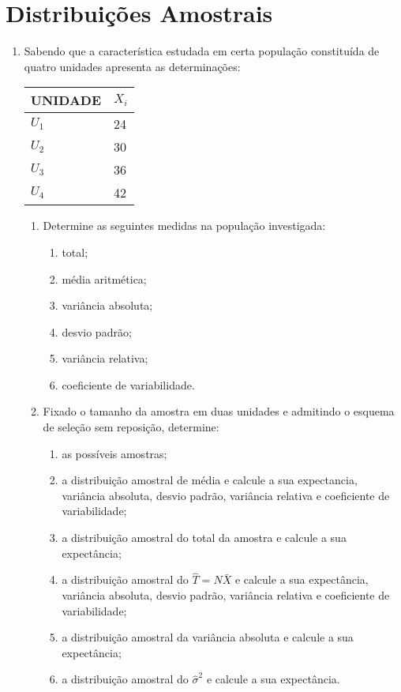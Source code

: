 \chapter{Distribuições Amostrais}

\begin{enumerate}[resume]

\item Sabendo que a característica estudada em certa população constituída de quatro unidades apresenta as determinações:
	\begin{table}[!htb]
	\centering
	\vspace{0.5cm}
	\begin{tabular}{ll}
	UNIDADE & $X_{i}$ \\
	\hline 
	$U_{1}$ & 24 \\
	$U_{2}$ & 30 \\
	$U_{3}$ & 36 \\
	$U_{4}$ & 42 \\
	\end{tabular}
	\end{table}
	\begin{enumerate}
	
	\item Determine as seguintes medidas na população investigada:
		\begin{enumerate}
		\item total;
		\item média aritmética; 
		\item variância absoluta;
		\item desvio padrão;
		\item variância relativa;
		\item coeficiente de variabilidade.
		\end{enumerate}
	
	\item Fixado o tamanho da amostra em duas unidades e admitindo o esquema de seleção sem reposição, determine:
		\begin{enumerate}
		\item as possíveis amostras;
		\item a distribuição amostral de média e calcule a sua expectancia, variância absoluta, desvio padrão, variância relativa e coeficiente de variabilidade;
		\item a distribuição amostral do total da amostra e calcule a sua expectância;
		\item a distribuição amostral do $\hat{T} = N\bar{X}$ e calcule a sua expectância, variância absoluta, desvio padrão, variância relativa e coeficiente de variabilidade;
		\item a distribuição amostral da variância absoluta e calcule a sua expectância;
		\item a distribuição amostral do $\hat{\sigma}^{2}$ e calcule a sua expectância.
		\end{enumerate}
	

\end{enumerate}
\end{enumerate}
